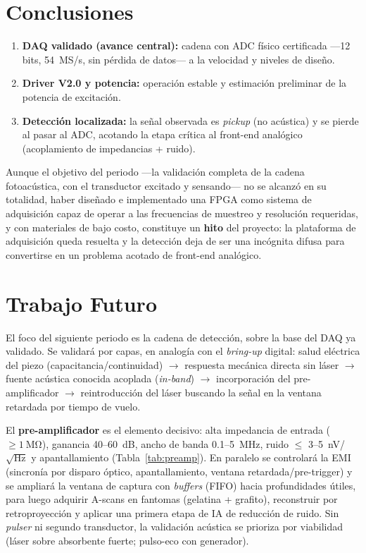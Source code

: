 \documentclass[12pt,letterpaper]{article}
\begin{document}
\section{Conclusiones}
\begin{enumerate}
    \item \textbf{DAQ validado (avance central):} cadena con ADC físico certificada
    —12 bits, 54~MS/s, sin pérdida de datos— a la velocidad y niveles de diseño.
    \item \textbf{Driver V2.0 y potencia:} operación estable y estimación preliminar de
    la potencia de excitación.
    \item \textbf{Detección localizada:} la señal observada es \textit{pickup} (no
    acústica) y se pierde al pasar al ADC, acotando la etapa crítica al front-end
    analógico (acoplamiento de impedancias + ruido).
\end{enumerate}

Aunque el objetivo del periodo —la validación completa de la cadena fotoacústica, con
el transductor excitado y sensando— no se alcanzó en su totalidad, haber diseñado e
implementado una FPGA como sistema de adquisición capaz de operar a las frecuencias de
muestreo y resolución requeridas, y con materiales de bajo costo, constituye un
\textbf{hito} del proyecto: la plataforma de adquisición queda resuelta y la detección
deja de ser una incógnita difusa para convertirse en un problema acotado de front-end
analógico.

\section{Trabajo Futuro}
\label{sec:futuro}

El foco del siguiente periodo es la cadena de detección, sobre la base del DAQ ya
validado. Se validará por capas, en analogía con el \textit{bring-up} digital:
salud eléctrica del piezo (capacitancia/continuidad) $\to$ respuesta mecánica directa
sin láser $\to$ fuente acústica conocida acoplada (\textit{in-band}) $\to$
incorporación del pre-amplificador $\to$ reintroducción del láser buscando la señal en
la ventana retardada por tiempo de vuelo.

El \textbf{pre-amplificador} es el elemento decisivo: alta impedancia de entrada
($\geq \SI{1}{\mega\ohm}$), ganancia 40--60~dB, ancho de banda 0.1--5~MHz, ruido
$\leq$ 3--5~nV/$\sqrt{\text{Hz}}$ y apantallamiento (Tabla~\ref{tab:preamp}). En
paralelo se controlará la EMI (sincronía por disparo óptico, apantallamiento, ventana
retardada/pre-trigger) y se ampliará la ventana de captura con \textit{buffers} (FIFO)
hacia profundidades útiles, para luego adquirir A-scans en fantomas (gelatina +
grafito), reconstruir por retroproyección y aplicar una primera etapa de IA de
reducción de ruido. Sin \textit{pulser} ni segundo transductor, la validación acústica
se prioriza por viabilidad (láser sobre absorbente fuerte; pulso-eco con generador).
\end{document}
